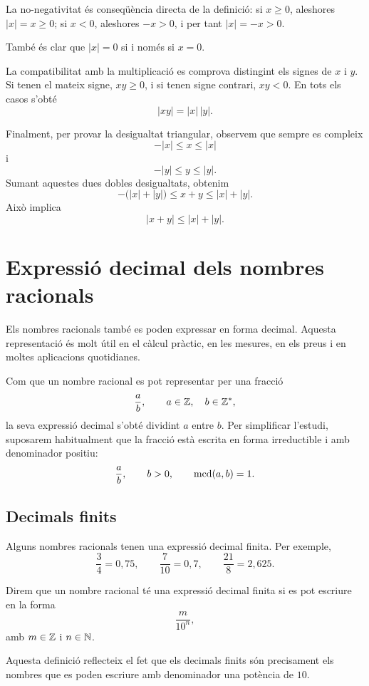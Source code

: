 \begin{prova}
La no-negativitat és conseqüència directa de la definició: si \(x\geq0\), aleshores \(|x|=x\geq0\); si \(x<0\), aleshores \(-x>0\), i per tant \(|x|=-x>0\).

També és clar que \(|x|=0\) si i només si \(x=0\).

La compatibilitat amb la multiplicació es comprova distingint els signes de \(x\) i \(y\). Si tenen el mateix signe, \(xy\geq0\), i si tenen signe contrari, \(xy<0\). En tots els casos s'obté
\[
	|xy|=|x|\,|y|.
\]

Finalment, per provar la desigualtat triangular, observem que sempre es compleix
\[
	-|x|\leq x\leq |x|
\]
i
\[
	-|y|\leq y\leq |y|.
\]
Sumant aquestes dues dobles desigualtats, obtenim
\[
	-\bigl(|x|+|y|\bigr)
	\leq
	x+y
	\leq
	|x|+|y|.
\]
Això implica
\[
	|x+y|\leq |x|+|y|.
\]
\end{prova}

\section{Expressió decimal dels nombres racionals}

Els nombres racionals també es poden expressar en forma decimal. Aquesta representació és molt útil en el càlcul pràctic, en les mesures, en els preus i en moltes aplicacions quotidianes.

Com que un nombre racional es pot representar per una fracció
\[
	\frac{a}{b},
	\qquad a\in\mathbb{Z},\quad b\in\mathbb{Z}^{*},
\]
la seva expressió decimal s'obté dividint \(a\) entre \(b\). Per simplificar l'estudi, suposarem habitualment que la fracció està escrita en forma irreductible i amb denominador positiu:
\[
	\frac{a}{b},
	\qquad b>0,\qquad \operatorname{mcd}(a,b)=1.
\]

\subsection{Decimals finits}

Alguns nombres racionals tenen una expressió decimal finita. Per exemple,
\[
	\frac{3}{4}=0{,}75,
	\qquad
	\frac{7}{10}=0{,}7,
	\qquad
	\frac{21}{8}=2{,}625.
\]

\begin{definicio}
Direm que un nombre racional té una expressió decimal finita si es pot escriure en la forma
\[
	\frac{m}{10^n},
\]
amb \(m\in\mathbb{Z}\) i \(n\in\mathbb{N}\).
\end{definicio}

Aquesta definició reflecteix el fet que els decimals finits són precisament els nombres que es poden escriure amb denominador una potència de \(10\).

